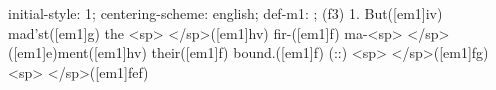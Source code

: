 initial-style: 1;
centering-scheme: english;
def-m1: \grealign;
(f3) 1. But([em1]iv) mad'st([em1]g) the <sp> </sp>([em1]hv) fir-([em1]f) ma-<sp> </sp>([em1]e)ment([em1]hv) their([em1]f) bound.([em1]f) (::) <sp> </sp>([em1]fg)<sp> </sp>([em1]fef)